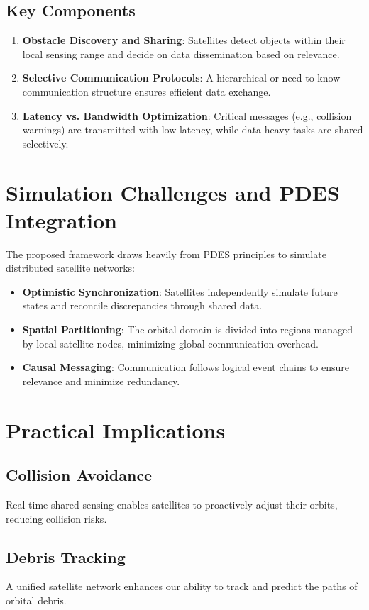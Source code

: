 \documentclass[11pt]{article}
\begin{document}
\subsection{Key Components}
\begin{enumerate}
    \item \textbf{Obstacle Discovery and Sharing}: Satellites detect objects within their local sensing range and decide on data dissemination based on relevance.
    \item \textbf{Selective Communication Protocols}: A hierarchical or need-to-know communication structure ensures efficient data exchange.
    \item \textbf{Latency vs. Bandwidth Optimization}: Critical messages (e.g., collision warnings) are transmitted with low latency, while data-heavy tasks are shared selectively.
\end{enumerate}

\section{Simulation Challenges and PDES Integration}
The proposed framework draws heavily from PDES principles to simulate distributed satellite networks:
\begin{itemize}
    \item \textbf{Optimistic Synchronization}: Satellites independently simulate future states and reconcile discrepancies through shared data.
    \item \textbf{Spatial Partitioning}: The orbital domain is divided into regions managed by local satellite nodes, minimizing global communication overhead.
    \item \textbf{Causal Messaging}: Communication follows logical event chains to ensure relevance and minimize redundancy.
\end{itemize}

\section{Practical Implications}
\subsection{Collision Avoidance}
Real-time shared sensing enables satellites to proactively adjust their orbits, reducing collision risks.

\subsection{Debris Tracking}
A unified satellite network enhances our ability to track and predict the paths of orbital debris.
\end{document}
